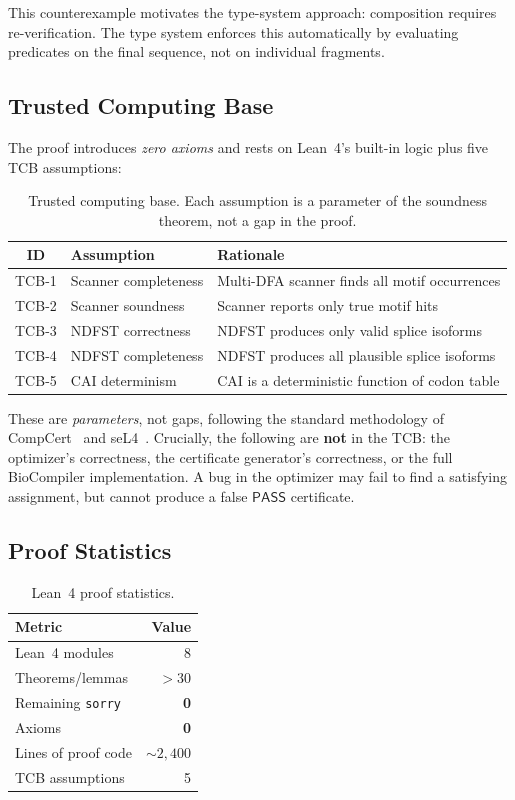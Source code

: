 \documentclass[runningheads]{llncs}
\newcommand{\PASS}{\ensuremath{\mathsf{PASS}}\xspace}
\begin{document}
This counterexample motivates the type-system approach: composition
requires re-verification.
The type system enforces this automatically by evaluating predicates on
the final sequence, not on individual fragments.

\subsection{Trusted Computing Base}\label{sec:tcb}

The proof introduces \emph{zero axioms} and rests on Lean~4's built-in
logic plus five TCB assumptions:

\begin{table}[t]
\centering
\caption{Trusted computing base. Each assumption is a parameter of the
         soundness theorem, not a gap in the proof.}
\label{tab:tcb}
\begin{tabular}{clp{5.0cm}}
\toprule
\textbf{ID} & \textbf{Assumption} & \textbf{Rationale} \\
\midrule
TCB-1 & Scanner completeness & Multi-DFA scanner finds all motif
  occurrences \\
TCB-2 & Scanner soundness & Scanner reports only true motif hits \\
TCB-3 & NDFST correctness & NDFST produces only valid splice
  isoforms \\
TCB-4 & NDFST completeness & NDFST produces all plausible splice
  isoforms \\
TCB-5 & CAI determinism & CAI is a deterministic function of codon
  table \\
\bottomrule
\end{tabular}
\end{table}

These are \emph{parameters}, not gaps, following the standard
methodology of CompCert~\cite{leroy2009compcert} and
seL4~\cite{klein2014sel4}.
Crucially, the following are \textbf{not} in the TCB:
the optimizer's correctness, the certificate generator's correctness,
or the full BioCompiler implementation.
A bug in the optimizer may fail to find a satisfying assignment, but
cannot produce a false \PASS{} certificate.

\subsection{Proof Statistics}

\begin{table}[t]
\centering
\caption{Lean~4 proof statistics.}
\label{tab:proofstats}
\begin{tabular}{lr}
\toprule
\textbf{Metric} & \textbf{Value} \\
\midrule
Lean~4 modules & 8 \\
Theorems/lemmas & $>$30 \\
Remaining \texttt{sorry} & \textbf{0} \\
Axioms & \textbf{0} \\
Lines of proof code & ${\sim}2{,}400$ \\
TCB assumptions & 5 \\
\bottomrule
\end{tabular}
\end{table}
\end{document}
